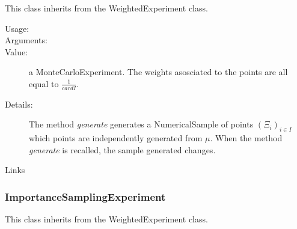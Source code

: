 This class inherits from the WeightedExperiment class.\\

\begin{description}

\item[Usage:] \rule{0pt}{1em}

\item[Arguments:]  \rule{0pt}{1em}

\item[Value:] a MonteCarloExperiment. The weights asosciated to the points are all equal to $\displaystyle \frac{1}{cardI}$.

\item[Details:]  The method \textit{generate} generates a NumericalSample of points  $(\Xi_i)_{i \in I}$  which points are independently generated from $\mu$. When the method \textit{generate} is recalled, the sample generated changes.

\item[Links] \rule{0pt}{1em}
\end{description}


\newpage
\subsubsection{ImportanceSamplingExperiment}

This class inherits from the WeightedExperiment class.\\

